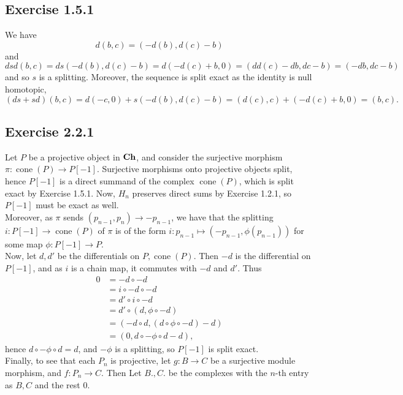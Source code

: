 \documentclass{article}
\theoremstyle{definition}
\DeclareMathOperator{\cone}{cone}
\newcommand{\catname}[1]{{\normalfont\textbf{#1}}}
\newcommand{\Ch}{\catname{Ch}}
\begin{document}
\subsection*{Exercise 1.5.1}

We have 
\[
	d(b, c)
	=
	(-d(b), d(c) - b)
\] 
and
\[
	dsd(b, c)
	=
	ds(-d(b), d(c) - b)
	=
	d(-d(c) + b, 0)
	=
	(dd(c) - db, dc - b)
	=
	(-db, dc - b)
\] 
and so $s$ is a splitting. Moreover, the sequence is split exact as the
identity is null homotopic,
\[
	(ds + sd)(b, c)
	=
	d(-c, 0)
	+
	s(-d(b), d(c) - b)
	=
	(d(c), c)
	+
	(-d(c) + b, 0)
	=
	(b, c).
\]

\subsection*{Exercise 2.2.1}


Let $P$ be a projective object in $\Ch$, and consider the surjective
morphism $\pi : \cone(P) \to P[-1]$. Surjective morphisms onto projective
objects split, hence $P[-1]$ is a direct summand of the complex $\cone(P)$,
which is split exact by Exercise 1.5.1. Now, $H_n$ preserves direct sums by
Exercise 1.2.1, so $P[-1]$ must be exact as well. \\

Moreover, as $\pi$ sends $(p_{n - 1}, p_n) \to -p_{n - 1}$, we have that the
splitting $i : P[-1] \to \cone(P)$ of $\pi$ is of the form $i : p_{n - 1}
\mapsto (-p_{n - 1}, \phi(p_{n - 1}))$ for some map $\phi : P[-1] \to P$. \\

Now, let $d, d'$ be the differentials on $P, \cone(P)$. Then $-d$ is the differential 
on $P[-1]$, and as $i$ is a chain map, it commutes with $-d$ and $d'$. Thus
\begin{align*}
	0
	&=
	-d \circ -d \\
	&=
	i \circ -d \circ -d \\
	&=
	d' \circ i \circ -d \\
	&=
	d' \circ (d, \phi \circ -d) \\
	&=
	(-d \circ d, (d \circ \phi \circ - d) - d) \\
	&=
	(0, d \circ -\phi \circ d - d),
\end{align*}
hence $d \circ -\phi \circ d = d$, and $-\phi$ is a splitting, so $P[-1]$ is split exact. \\

Finally, to see that each $P_n$ is projective, let $g : B \to C$ be a
surjective module morphism, and $f : P_n \to C$. Then Let $B., C.$ be the
complexes with the $n$-th entry as $B, C$ and the rest $0$.
\end{document}
